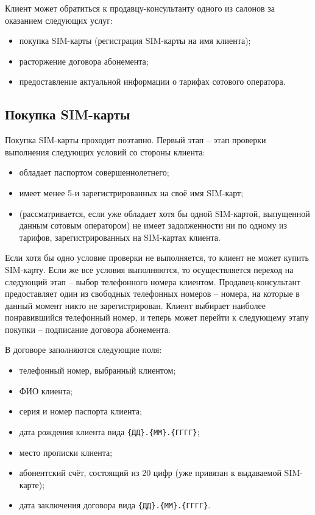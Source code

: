 Клиент может обратиться к продавцу-консультанту одного из салонов за оказанием следующих услуг:
\begin{itemize}
    \item покупка SIM-карты (регистрация SIM-карты на имя клиента);
    \item расторжение договора абонемента;
    \item предоставление актуальной информации о тарифах сотового оператора.
\end{itemize}


\subsection{Покупка SIM-карты}


Покупка SIM-карты проходит поэтапно. Первый этап -- этап проверки выполнения следующих условий со стороны клиента:
\begin{itemize}
    \item обладает паспортом совершеннолетнего;
    \item имеет менее 5-и зарегистрированных на своё имя SIM-карт;
    \item (рассматривается, если уже обладает хотя бы одной SIM-картой, выпущенной данным сотовым оператором) не имеет задолженности ни по одному из тарифов, зарегистрированных на SIM-картах клиента.
\end{itemize}

Если хотя бы одно условие проверки не выполняется, то клиент не может купить SIM-карту. Если же все условия выполняются, то осуществляется переход на следующий этап -- выбор телефонного номера клиентом. Продавец-консультант предоставляет один из свободных телефонных номеров -- номера, на которые в данный момент никто не зарегистрирован. Клиент выбирает наиболее понравившийся телефонный номер, и теперь может перейти к следующему этапу покупки -- подписание договора абонемента.

В договоре заполняются следующие поля:
\begin{itemize}
    \item телефонный номер, выбранный клиентом;
    \item ФИО клиента;
    \item серия и номер паспорта клиента;
    \item дата рождения клиента вида \texttt{\{ДД\}.\{ММ\}.\{ГГГГ\}};
    \item место прописки клиента;
    \item абонентский счёт, состоящий из 20 цифр (уже привязан к выдаваемой SIM-карте);
    \item дата заключения договора вида \texttt{\{ДД\}.\{ММ\}.\{ГГГГ\}}.
\end{itemize}

